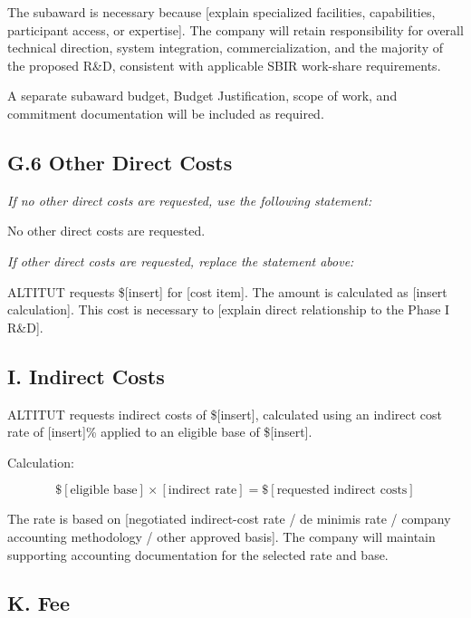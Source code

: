 \documentclass[11pt,letterpaper]{article}
\begin{document}
The subaward is necessary because [explain specialized facilities,
capabilities, participant access, or expertise]. The company will retain
responsibility for overall technical direction, system integration,
commercialization, and the majority of the proposed R\&D, consistent with
applicable SBIR work-share requirements.

A separate subaward budget, Budget Justification, scope of work, and
commitment documentation will be included as required.

\subsection*{G.6 Other Direct Costs}

\textit{If no other direct costs are requested, use the following statement:}

No other direct costs are requested.

\medskip

\textit{If other direct costs are requested, replace the statement above:}

ALTITUT requests \$[insert] for [cost item]. The amount is calculated as
[insert calculation]. This cost is necessary to [explain direct relationship
to the Phase I R\&D].

\subsection*{I. Indirect Costs}

ALTITUT requests indirect costs of \$[insert], calculated using an indirect
cost rate of [insert]\% applied to an eligible base of \$[insert].

Calculation:

\[
\$[\text{eligible base}]
\times
[\text{indirect rate}]
=
\$[\text{requested indirect costs}]
\]

The rate is based on [negotiated indirect-cost rate / de minimis rate /
company accounting methodology / other approved basis]. The company will
maintain supporting accounting documentation for the selected rate and base.

\subsection*{K. Fee}
\end{document}
